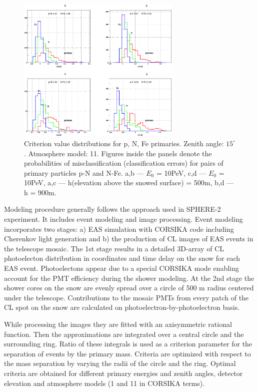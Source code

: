 \documentclass[a4paper]{jpconf}
\begin{document}
\begin{figure}[t]
\centering %
\includegraphics[width=0.7\textwidth]{Fig3.png}
\caption{Criterion value distributions for p, N, Fe primaries. Zenith angle: $15^\circ$. Atmosphere model: 11. Figures inside the panels denote the probabilities of misclassification (classification errors) for pairs of primary particles p-N and N-Fe. a,b --- $E_0$ = 10PeV, c,d --- $E_0$ = 10PeV, a,c --- h(elevation above the snowed surface) = 500m, b,d --- h = 900m.}
\label{fig:Modelling}
\end{figure}

Modeling procedure generally follows the approach used in SPHERE-2 experiment. It includes event modeling and image processing.
Event modeling incorporates two stages: a) EAS simulation with CORSIKA code including Cherenkov light generation and b) the production of CL images of EAS events in the telescope mosaic. The 1st stage results in a detailed 3D-array of CL photoelecton distribution in coordinates and time delay on the snow for each EAS event. Photoelectons appear due to a special CORSIKA mode enabling account for the PMT efficiency during the shower modeling. At the 2nd stage the shower cores on the snow are evenly spread over a circle of 500 m radius centered under the telescope. Contributions to the mosaic PMTs from every patch of the CL spot on the snow are calculated on photoelectron-by-photoelectron basis.

While processing the images they are fitted with an axisymmetric rational function. Then the approximations are integrated over a central circle and the surrounding ring. Ratio of these integrals is used as a criterion parameter for the separation of events by the primary mass. Criteria are optimized with respect to the mass separation by varying the radii of the circle and the ring. Optimal criteria are obtained for different primary energies and zenith angles, detector elevation and atmosphere models (1 and 11 in CORSIKA terms).
\end{document}
